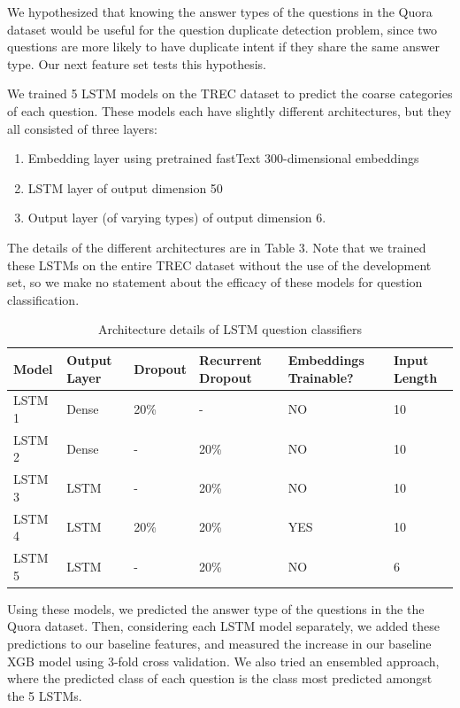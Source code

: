 \documentclass[letterpaper, 10 pt, conference]{ieeeconf}  %
\begin{document}
We hypothesized that knowing the answer types of the questions in the Quora dataset would be useful for the question duplicate detection problem, since two questions are more likely to have duplicate intent if they share the same answer type. Our next feature set tests this hypothesis. 

We trained 5 LSTM models on the TREC dataset to predict the coarse categories of each question. These models each have slightly different architectures, but they all consisted of three layers:
\begin{enumerate}
\item Embedding layer using pretrained fastText 300-dimensional embeddings
\item LSTM layer of output dimension 50
\item Output layer (of varying types) of output dimension 6.
\end{enumerate}
The details of the different architectures are in Table 3. Note that we trained these LSTMs on the entire TREC dataset without the use of the development set,  so we make no statement about the efficacy of these models for question classification.


\begin{table}[]
\centering
\caption{Architecture details of LSTM question classifiers }
\label{my-label}
\begin{tabular}{|p{10mm}|p{10mm}|p{10mm}|p{10mm}|p{14mm}|p{8mm}|}
\hline
Model  & Output Layer & Dropout  & Recurrent Dropout & Embeddings Trainable? & Input Length \\ \hline
LSTM 1 & Dense             & 20\%                   & -                 & NO                    & 10           \\
LSTM 2 & Dense             & -                      & 20\%              & NO                    & 10           \\
LSTM 3 & LSTM              & -                      & 20\%              & NO                    & 10           \\
LSTM 4 & LSTM              & 20\%                   & 20\%              & YES                   & 10           \\
LSTM 5 & LSTM              & -                      & 20\%              & NO                    & 6            \\ \hline
\end{tabular}
\end{table}

Using these models, we predicted the answer type of the questions in the the Quora dataset. Then, considering each LSTM model separately, we added these predictions to our baseline features, and measured the increase in our baseline XGB model using 3-fold cross validation. We also tried an ensembled approach, where the predicted class of each question is the class most predicted amongst the 5 LSTMs.
\end{document}
